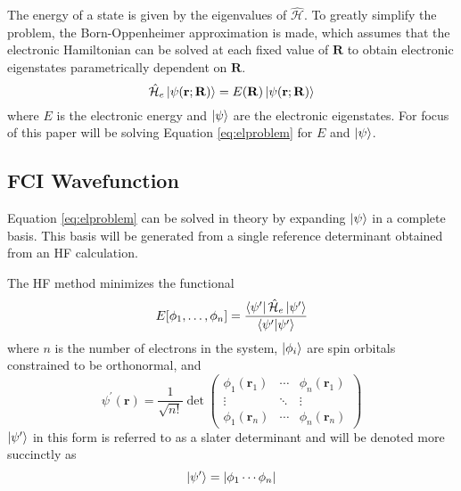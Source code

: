 \documentclass[final,3p,times,twocolumn]{elsarticle}
\newcommand{\ham}{\hat{\mathcal{H}}}
\begin{document}
The energy of a state is given by the eigenvalues of $\ham$. To greatly simplify the problem, the Born-Oppenheimer approximation\cite{bo} is made, which assumes that the electronic Hamiltonian can be solved at each fixed value of $\mathbf{R}$ to obtain electronic eigenstates parametrically dependent on $\mathbf{R}$.
\begin{equation}\label{eq:elproblem}
\ham_e \ket{\psi(\mathbf{r};\mathbf{R})} = E(\mathbf{R}) \ket{\psi(\mathbf{r};\mathbf{R})}
\end{equation}
where $E$ is the electronic energy and $\ket{\psi}$ are the electronic eigenstates. For focus of this paper will be solving Equation \eqref{eq:elproblem} for $E$ and $\ket{\psi}$.

\subsection{FCI Wavefunction} \label{sec:wf}
Equation \eqref{eq:elproblem} can be solved in theory by expanding $\ket{\psi}$ in a complete basis. This basis will be generated from a single reference determinant obtained from an HF calculation. 

The HF method\cite{hartree,fock,roothaan} minimizes the functional
\begin{equation}
E[\phi_1, \ldots, \phi_n] = \dfrac{\bra{\psi^\prime}\ham_e\ket{\psi^\prime}}{\bra{\psi^\prime}\ket{\psi^\prime}}
\end{equation}
where $n$ is the number of electrons in the system, $\ket{\phi_i}$ are spin orbitals constrained to be orthonormal, and 
\begin{equation} \label{eq:det}
\psi^\prime(\mathbf{r}) = \dfrac{1}{\sqrt{n!}}\det\begin{pmatrix} \phi_1(\mathbf{r}_1) & \cdots & \phi_n(\mathbf{r}_1) \\ \vdots & \ddots & \vdots \\
\phi_1(\mathbf{r}_n) & \cdots & \phi_n(\mathbf{r}_n) \end{pmatrix}
\end{equation}
$\ket{\psi^\prime}$ in this form is referred to as a slater determinant\cite{slater} and will be denoted more succinctly as
\begin{equation}
\ket{\psi^\prime} = |\phi_1 \cdots \phi_n|
\end{equation}
\end{document}

